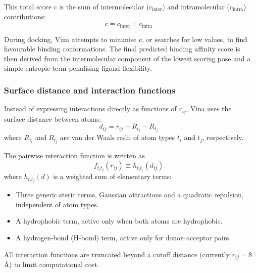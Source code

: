 \documentclass[12pt]{article}
\begin{document}
This total score c is the sum of intermolecular ($\text{c}_{\text{inter}}$) and intramolecular ($\text{c}_{\text{intra}}$) contributions:
\begin{equation}
  c = c_{\textrm{inter}} + c_{\textrm{intra}}
\end{equation}

During docking, Vina attempts to minimise c, or searches for low values, to find favourable binding conformations.  The final predicted binding affinity score is then derived from the intermolecular component of the lowest scoring pose and a simple entropic term penalising ligand flexibility\cite{CH7_trott2010vina}.

\subsubsection{Surface distance and interaction functions}

Instead of expressing interactions directly as functions of $r_{ij}$, Vina uses the surface distance between atoms:
\begin{equation}
  d_{ij} = r_{ij} - R_{t_i} - R_{t_j}
\end{equation}
where $R_{t_i}$ and $R_{t_j}$ are van der Waals radii of atom types $t_i$ and $t_j$, respectively.

The pairwise interaction function is written as
\begin{equation}
  f_{t_i t_j}(r_{ij}) \equiv h_{t_i t_j}(d_{ij})
\end{equation}
where $h_{t_i t_j}(d)$ is a weighted sum of elementary terms:
\begin{itemize}
  \item Three generic steric terms, Gaussian attractions and a quadratic repulsion, independent of atom types.
  \item A hydrophobic term, active only when both atoms are hydrophobic.
  \item A hydrogen-bond (H-bond) term, active only for donor–acceptor pairs.
\end{itemize}

All interaction functions are truncated beyond a cutoff distance (currently $r_{ij} = 8$ \r{A}) to limit computational cost\cite{CH7_trott2010vina}.
\end{document}
